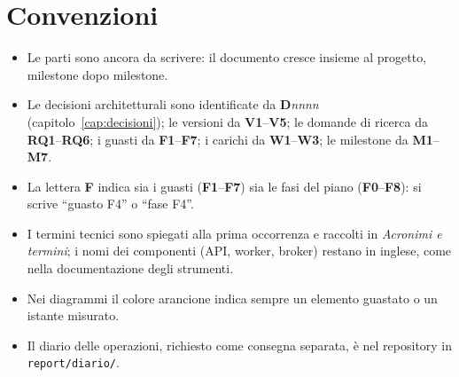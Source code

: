 \section*{Convenzioni}

\begin{itemize}
  \item Le parti  sono ancora da scrivere: il documento cresce insieme al progetto, milestone dopo milestone.
  \item Le decisioni architetturali sono identificate da \textbf{D}\textit{nnnn} (capitolo~\ref{cap:decisioni}); le versioni da \textbf{V1}--\textbf{V5}; le domande di ricerca da \textbf{RQ1}--\textbf{RQ6}; i guasti da \textbf{F1}--\textbf{F7}; i carichi da \textbf{W1}--\textbf{W3}; le milestone da \textbf{M1}--\textbf{M7}.
  \item La lettera \textbf{F} indica sia i guasti (\textbf{F1}--\textbf{F7}) sia le fasi del piano (\textbf{F0}--\textbf{F8}): si scrive ``guasto F4'' o ``fase F4''.
  \item I termini tecnici sono spiegati alla prima occorrenza e raccolti in \emph{Acronimi e termini}; i nomi dei componenti (API, worker, broker) restano in inglese, come nella documentazione degli strumenti.
  \item Nei diagrammi il colore arancione indica sempre un elemento guastato o un istante misurato.
  \item Il diario delle operazioni, richiesto come consegna separata, è nel repository in \texttt{report/diario/}.
\end{itemize}
